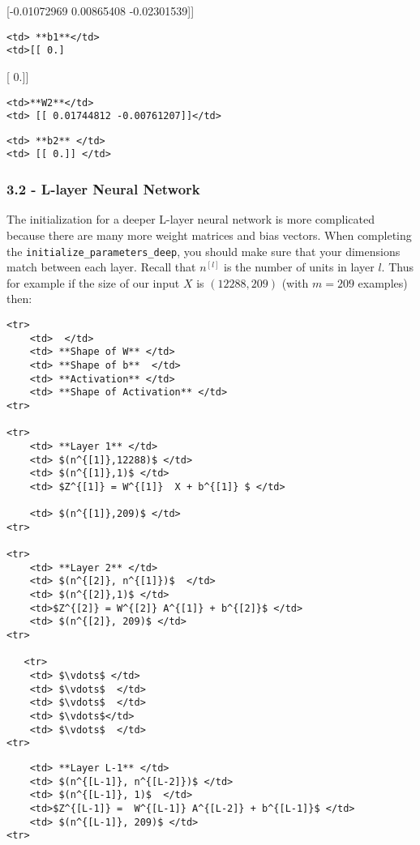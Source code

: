 \documentclass[11pt]{article}
\begin{document}
{[}-0.01072969 0.00865408 -0.02301539{]}{]}

\begin{verbatim}
<td> **b1**</td>
<td>[[ 0.]
\end{verbatim}

{[} 0.{]}{]}

\begin{verbatim}
<td>**W2**</td>
<td> [[ 0.01744812 -0.00761207]]</td>
\end{verbatim}

\begin{verbatim}
<td> **b2** </td>
<td> [[ 0.]] </td> 
\end{verbatim}

    \subsubsection{3.2 - L-layer Neural
Network}\label{l-layer-neural-network}

The initialization for a deeper L-layer neural network is more
complicated because there are many more weight matrices and bias
vectors. When completing the \texttt{initialize\_parameters\_deep}, you
should make sure that your dimensions match between each layer. Recall
that \(n^{[l]}\) is the number of units in layer \(l\). Thus for example
if the size of our input \(X\) is \((12288, 209)\) (with \(m=209\)
examples) then:

\begin{verbatim}
<tr>
    <td>  </td> 
    <td> **Shape of W** </td> 
    <td> **Shape of b**  </td> 
    <td> **Activation** </td>
    <td> **Shape of Activation** </td> 
<tr>

<tr>
    <td> **Layer 1** </td> 
    <td> $(n^{[1]},12288)$ </td> 
    <td> $(n^{[1]},1)$ </td> 
    <td> $Z^{[1]} = W^{[1]}  X + b^{[1]} $ </td> 
    
    <td> $(n^{[1]},209)$ </td> 
<tr>

<tr>
    <td> **Layer 2** </td> 
    <td> $(n^{[2]}, n^{[1]})$  </td> 
    <td> $(n^{[2]},1)$ </td> 
    <td>$Z^{[2]} = W^{[2]} A^{[1]} + b^{[2]}$ </td> 
    <td> $(n^{[2]}, 209)$ </td> 
<tr>

   <tr>
    <td> $\vdots$ </td> 
    <td> $\vdots$  </td> 
    <td> $\vdots$  </td> 
    <td> $\vdots$</td> 
    <td> $\vdots$  </td> 
<tr>
\end{verbatim}

\begin{verbatim}
    <td> **Layer L-1** </td> 
    <td> $(n^{[L-1]}, n^{[L-2]})$ </td> 
    <td> $(n^{[L-1]}, 1)$  </td> 
    <td>$Z^{[L-1]} =  W^{[L-1]} A^{[L-2]} + b^{[L-1]}$ </td> 
    <td> $(n^{[L-1]}, 209)$ </td> 
<tr>
\end{verbatim}
\end{document}
